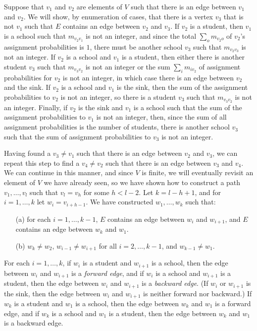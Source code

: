 \documentclass[12pt]{article}
\theoremstyle{definition}
\begin{document}
Suppose that $v_1$ and $v_2$ are elements of $V$ such that there is an
edge between $v_1$ and $v_2$.  We will show, by enumeration of cases,
that there is a vertex $v_3$ that is not $v_1$ such that $E$ contains
an edge between $v_2$ and $v_3$. If $v_2$ is a student, then $v_1$ is
a school such that $m_{v_2v_1}$ is not an integer, and since the
total $\sum_o m_{v_2o}$ of $v_2$'s assignment probabilities is $1$,
there must be another school $v_3$ such that $m_{v_2v_3}$ is not an
integer.  If $v_2$ is a school and $v_1$ is a student, then either
there is another student $v_3$ such that $m_{v_3v_2}$ is not an
integer or the sum $\sum_i m_{iv_2}$ of assignment probabilities for
$v_2$ is not an integer, in which case there is an edge between $v_2$
and the sink.  If $v_2$ is a school and $v_1$ is the sink, then the
sum of the assignment probabilities to $v_2$ is not an integer, so
there is a student $v_3$ such that $m_{v_3v_2}$ is not an integer.
Finally, if $v_2$ is the sink and $v_1$ is a school such that the sum
of the assignment probabilities to $v_1$ is not an integer, then,
since the sum of all assignment probabilities is the number of
students, there is another school $v_3$ such that the sum of
assignment probabilities to $v_3$ is not an integer.

Having found a $v_3 \ne v_1$ such that there is an edge between $v_2$
and $v_3$, we can repeat this step to find a $v_4 \ne v_2$ such that
there is an edge between $v_3$ and $v_4$.  We can continue in this
manner, and since $V$ is finite, we will eventually revisit an element
of $V$ we have already seen, so we have shown how to construct a path
$v_1, \ldots, v_l$ such that $v_l = v_h$ for some $h < l - 2$.  Let
$k = l - h + 1$, and for $i = 1, \ldots, k$ let $w_i = v_{i + h - 1}$.
We have constructed $w_1, \ldots, w_k$ such that:
\begin{enumerate}
  \item[(a)] for each $i = 1, \ldots, k-1$, $E$ contains an edge
    between $w_i$ and $w_{i+1}$, and $E$ contains an edge between
    $w_k$ and $w_1$.
  \item[(b)] $w_k \ne w_2$, $w_{i-1} \ne w_{i+1}$ for all $i = 2,
    \ldots, k-1$, and $w_{k-1} \ne w_1$.
\end{enumerate}

For each $i = 1, \ldots, k$, if $w_i$ is a student and $w_{i+1}$ is a
school, then the edge between $w_i$ and $w_{i+1}$ is a \emph{forward
edge}, and if $w_i$ is a school and $w_{i+1}$ is a student, then the
edge between $w_i$ and $w_{i+1}$ is a \emph{backward edge}.  (If $w_i$
or $w_{i+1}$ is the sink, then the edge between $w_i$ and $w_{i+1}$ is
neither forward nor backward.)  If $w_k$ is a student and $w_1$ is a
school, then the edge between $w_k$ and $w_1$ is a forward edge, and
if $w_k$ is a school and $w_1$ is a student, then the edge between
$w_k$ and $w_1$ is a backward edge.
\end{document}
